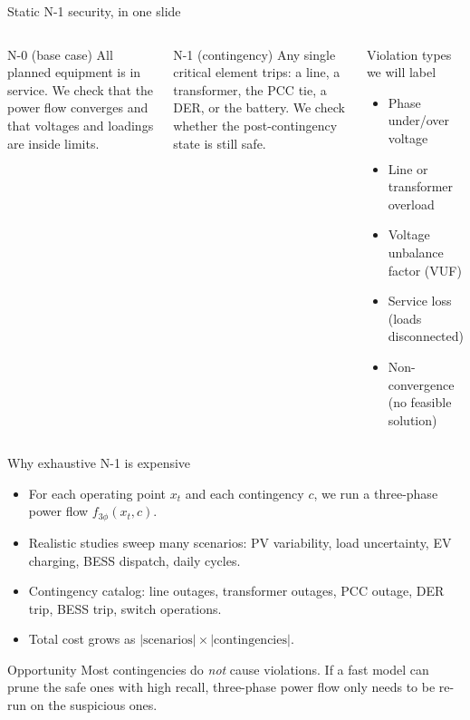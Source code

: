 \documentclass[aspectratio=169,10pt]{beamer}
\begin{document}
\begin{frame}{Static N-1 security, in one slide}
\begin{columns}[T]
\begin{block}{N-0 (base case)}
All planned equipment is in service. We check that the power flow converges and that voltages and loadings are inside limits.
\end{block}
\begin{block}{N-1 (contingency)}
Any single critical element trips: a line, a transformer, the PCC tie, a DER, or the battery. We check whether the post-contingency state is still safe.
\end{block}
\begin{alertblock}{Violation types we will label}
\begin{itemize}
  \item Phase under/over voltage
  \item Line or transformer overload
  \item Voltage unbalance factor (VUF)
  \item Service loss (loads disconnected)
  \item Non-convergence (no feasible solution)
\end{itemize}
\end{alertblock}
\end{columns}
\end{frame}

\begin{frame}{Why exhaustive N-1 is expensive}
\begin{itemize}
  \item For each operating point $x_t$ and each contingency $c$, we run a three-phase power flow $f_{3\phi}(x_t,c)$.
  \item Realistic studies sweep many scenarios: PV variability, load uncertainty, EV charging, BESS dispatch, daily cycles.
  \item Contingency catalog: line outages, transformer outages, PCC outage, DER trip, BESS trip, switch operations.
  \item Total cost grows as $|\text{scenarios}| \times |\text{contingencies}|$.
\end{itemize}
\begin{block}{Opportunity}
Most contingencies do \emph{not} cause violations. If a fast model can prune the safe ones with high recall, three-phase power flow only needs to be re-run on the suspicious ones.
\end{block}
\end{frame}
\end{document}
